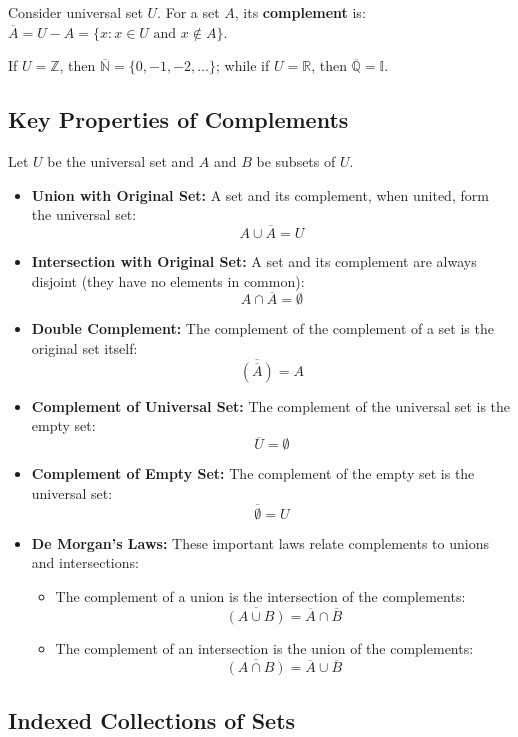 \documentclass[../Main.tex]{subfiles}
\begin{document}
Consider universal set $U$. For a set $A$, its \textbf{complement} is: 
$\overline{A} = U - A = \{x : x \in U \text{ and } x \notin A\}$.

If $U = \mathbb{Z}$, then $\overline{\mathbb{N}} = \{0, -1, -2, \dots\}$; while if $U = \mathbb{R}$, then $\overline{\mathbb{Q}} = \mathbb{I}$.

\subsection*{Key Properties of Complements}

Let $U$ be the universal set and $A$ and $B$ be subsets of $U$.

\begin{itemize}
    \item \textbf{Union with Original Set:} A set and its complement, when united, form the universal set:
    \[A \cup \overline{A} = U\]
    \item \textbf{Intersection with Original Set:} A set and its complement are always disjoint (they have no elements in common):
    \[A \cap \overline{A} = \emptyset\]
    \item \textbf{Double Complement:} The complement of the complement of a set is the original set itself:
    \[\overline{(\overline{A})} = A\]
    \item \textbf{Complement of Universal Set:} The complement of the universal set is the empty set:
    \[\overline{U} = \emptyset\]
    \item \textbf{Complement of Empty Set:} The complement of the empty set is the universal set:
    \[\overline{\emptyset} = U\]
    \item \textbf{De Morgan's Laws:} These important laws relate complements to unions and intersections:
    \begin{itemize}
        \item The complement of a union is the intersection of the complements:
        \[\overline{(A \cup B)} = \overline{A} \cap \overline{B}\]
        \item The complement of an intersection is the union of the complements:
        \[\overline{(A \cap B)} = \overline{A} \cup \overline{B}\]
    \end{itemize}
\end{itemize}

\subsection{Indexed Collections of Sets}
\end{document}
